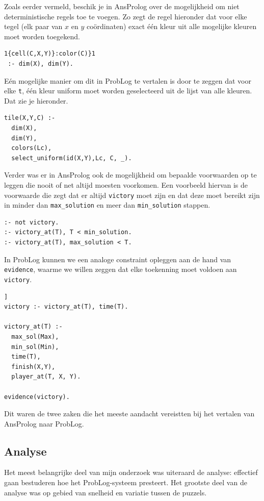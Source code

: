 \documentclass{article}
\begin{document}
	 Zoals eerder vermeld, beschik je in AnsProlog over de mogelijkheid om niet deterministische regels toe te voegen. Zo zegt de regel hieronder dat voor elke tegel (elk paar van $x$ en $y$ co\"ordinaten) exact \'e\'en kleur uit alle mogelijke kleuren moet worden toegekend.
	 
\begin{lstlisting}[language=Prolog-pretty]
1{cell(C,X,Y)}:color(C)}1 
 :- dim(X), dim(Y).
\end{lstlisting}

E\'en mogelijke manier om dit in ProbLog te vertalen is door te zeggen dat voor elke \texttt{t}, \'e\'en kleur uniform moet worden geselecteerd uit de lijst van alle kleuren. Dat zie je hieronder.
\begin{lstlisting}[language=Prolog-pretty]
tile(X,Y,C) :-
  dim(X),
  dim(Y),
  colors(Lc),
  select_uniform(id(X,Y),Lc, C, _).
\end{lstlisting}

Verder was er in AnsProlog ook de mogelijkheid om bepaalde voorwaarden op te leggen die nooit of net altijd moesten voorkomen. Een voorbeeld hiervan is de voorwaarde die zegt dat er altijd \texttt{victory} moet zijn en dat deze moet bereikt zijn in minder dan \texttt{max\_solution} en meer dan \texttt{min\_solution} stappen.

\begin{lstlisting}[language=Prolog-pretty]
:- not victory.
:- victory_at(T), T < min_solution.
:- victory_at(T), max_solution < T.
\end{lstlisting}

In ProbLog kunnen we een analoge constraint opleggen aan de hand van \texttt{evidence}, waarme we willen zeggen dat elke toekenning moet voldoen aan \texttt{victory}.
\begin{lstlisting}[language=Prolog-pretty,xleftmargin=0\textwidth,xrightmargin=.0\textwidth]]
victory :- victory_at(T), time(T).

victory_at(T) :-
  max_sol(Max),
  min_sol(Min),
  time(T),
  finish(X,Y),
  player_at(T, X, Y).
  
evidence(victory).
\end{lstlisting}

Dit waren de twee zaken die het meeste aandacht vereistten bij het vertalen van AnsProlog naar ProbLog.

	\subsection{Analyse}
Het meest belangrijke deel van mijn onderzoek was uiteraard de analyse: effectief gaan bestuderen hoe het ProbLog-systeem presteert. Het grootste deel van de analyse was op gebied van snelheid en variatie tussen de puzzels.
\end{document}
